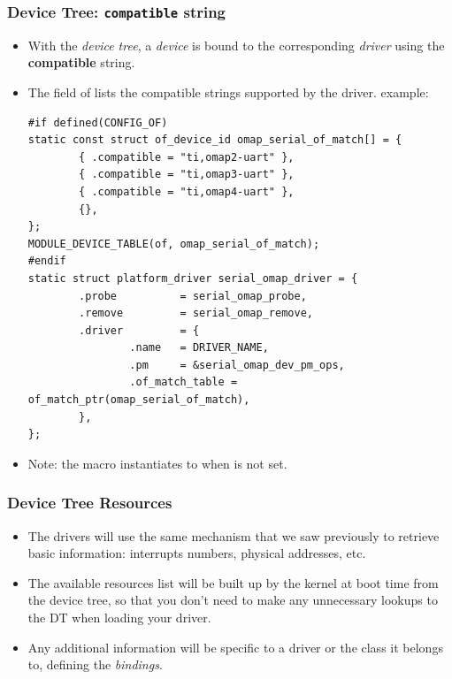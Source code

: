 \begin{frame}[fragile]
  \frametitle{Device Tree: {\tt compatible} string}
  \small
  \begin{itemize}
  \item With the {\em device tree}, a {\em device} is bound to the
    corresponding {\em driver} using the {\bf compatible} string.
  \item The  field of 
    lists the compatible strings supported by the driver.
     example:
    \begin{block}{}
  \begin{verbatim}
#if defined(CONFIG_OF)
static const struct of_device_id omap_serial_of_match[] = {
        { .compatible = "ti,omap2-uart" },
        { .compatible = "ti,omap3-uart" },
        { .compatible = "ti,omap4-uart" },
        {},
};
MODULE_DEVICE_TABLE(of, omap_serial_of_match);
#endif
static struct platform_driver serial_omap_driver = {
        .probe          = serial_omap_probe,
        .remove         = serial_omap_remove,
        .driver         = {
                .name   = DRIVER_NAME,
                .pm     = &serial_omap_dev_pm_ops,
                .of_match_table = of_match_ptr(omap_serial_of_match),
        },
};
\end{verbatim}
\end{block}
  \item Note: the  macro instantiates to 
        when  is not set.
  \end{itemize}
\end{frame}

\begin{frame}
  \frametitle{Device Tree Resources}
  \begin{itemize}
  \item The drivers will use the same mechanism that we saw previously
    to retrieve basic information: interrupts numbers, physical
    addresses, etc.
  \item The available resources list will be built up by the kernel at
    boot time from the device tree, so that you don't need to make any
    unnecessary lookups to the DT when loading your driver.
  \item Any additional information will be specific to a driver or
    the class it belongs to, defining the {\em bindings}.
  \end{itemize}
\end{frame}

